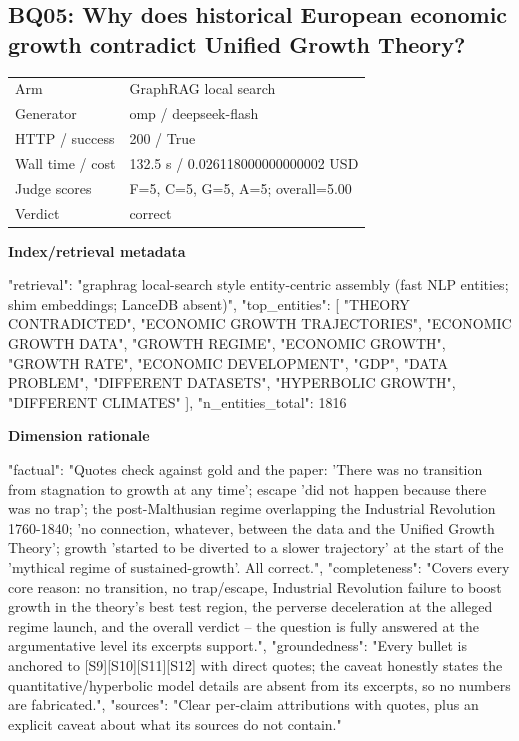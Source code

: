 \documentclass[10pt]{article}
\begin{document}
\subsection{BQ05: Why does historical European economic growth contradict Unified Growth Theory?}
\begin{tabular}{@{}ll@{}}
Arm & GraphRAG local search\\
Generator & omp / deepseek-flash\\
HTTP / success & 200 / True\\
Wall time / cost & 132.5 s / 0.026118000000000002 USD\\
Judge scores & F=5, C=5, G=5, A=5; overall=5.00\\
Verdict & correct\\
\end{tabular}

\textbf{Index/retrieval metadata}
\begin{EvidenceText}
{
  "retrieval": "graphrag local-search style entity-centric assembly (fast NLP entities; shim embeddings; LanceDB absent)",
  "top_entities": [
    "THEORY CONTRADICTED",
    "ECONOMIC GROWTH TRAJECTORIES",
    "ECONOMIC GROWTH DATA",
    "GROWTH REGIME",
    "ECONOMIC GROWTH",
    "GROWTH RATE",
    "ECONOMIC DEVELOPMENT",
    "GDP",
    "DATA PROBLEM",
    "DIFFERENT DATASETS",
    "HYPERBOLIC GROWTH",
    "DIFFERENT CLIMATES"
  ],
  "n_entities_total": 1816
}
\end{EvidenceText}

\textbf{Dimension rationale}
\begin{EvidenceText}
{
  "factual": "Quotes check against gold and the paper: 'There was no transition from stagnation to growth at any time'; escape 'did not happen because there was no trap'; the post-Malthusian regime overlapping the Industrial Revolution 1760-1840; 'no connection, whatever, between the data and the Unified Growth Theory'; growth 'started to be diverted to a slower trajectory' at the start of the 'mythical regime of sustained-growth'. All correct.",
  "completeness": "Covers every core reason: no transition, no trap/escape, Industrial Revolution failure to boost growth in the theory's best test region, the perverse deceleration at the alleged regime launch, and the overall verdict -- the question is fully answered at the argumentative level its excerpts support.",
  "groundedness": "Every bullet is anchored to [S9][S10][S11][S12] with direct quotes; the caveat honestly states the quantitative/hyperbolic model details are absent from its excerpts, so no numbers are fabricated.",
  "sources": "Clear per-claim attributions with quotes, plus an explicit caveat about what its sources do not contain."
}
\end{EvidenceText}
\end{document}
